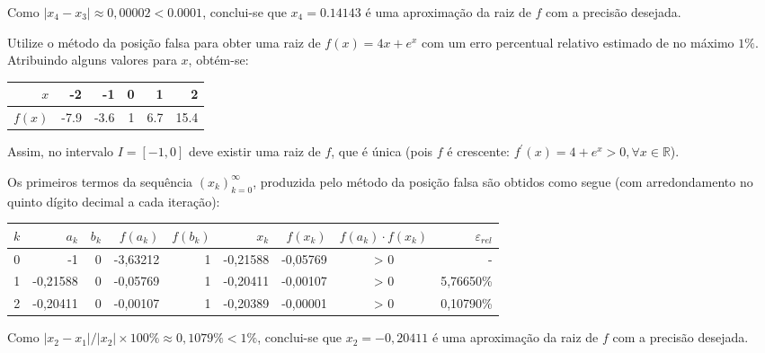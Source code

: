 \documentclass[12pt,a4paper]{article}
\newcommand*\R{\mathbb{R}}
\begin{document}
\begin{ExerciseList}
\begin{itemize}
Como $|x_4 - x_3| \approx 0,00002 < 0.0001$, conclui-se que $x_4 = 0.14143$ é uma aproximação da raiz de $f$ com a precisão desejada.
\end{itemize}

\Exercise[title={2,0}]
Utilize o método da posição falsa para obter uma raiz de $f(x) = 4x + e^x$ com um erro percentual relativo estimado de no máximo $1 \%$.
\Answer Atribuindo alguns valores para $x$, obtém-se:
\begin{center}
\begin{tabular}{|r|r|r|r|r|r|}
\hline
$x$    & -2 & -1 & 0 & 1 & 2 \\
\hline
$f(x)$ & -7.9 & -3.6 & 1 & 6.7 & 15.4 \\
\hline
\end{tabular}
\end{center}
Assim, no intervalo $I = [-1, 0]$ deve existir uma raiz de $f$, que é única (pois $f$ é crescente: $f^\prime(x) = 4 + e^x > 0, \forall x \in \R$).

Os primeiros termos da sequência $(x_k)_{k=0}^\infty$, produzida pelo método da posição falsa são obtidos como segue (com arredondamento no quinto dígito decimal a cada iteração):
\begin{center}
\begin{tabular}{|r|r|r|r|r|r|r|c|r|}
\hline
$k$ & $a_k$ & $b_k$ & $f(a_k)$ & $f(b_k)$ & $x_k$ & $f(x_k)$ & $f(a_k)\cdot f(x_k)$ & $\varepsilon_{rel}$ \\
\hline
0 & -1 & 0 & -3,63212 & 1 & -0,21588 & -0,05769 & > 0 & - \\
\hline
1 & -0,21588 & 0 & -0,05769 & 1 & -0,20411 & -0,00107 & > 0 & 5,76650\% \\
\hline
2 & -0,20411 & 0 & -0,00107 & 1 & -0,20389 & -0,00001 & > 0 & 0,10790\% \\
\hline
\end{tabular}
\end{center}
\medskip
Como $|x_2 - x_1|/|x_2| \times 100 \% \approx 0,1079 \% < 1 \%$, conclui-se que $x_2 = -0,20411$ é uma aproximação da raiz de $f$ com a precisão desejada.


\end{ExerciseList}
\end{document}
